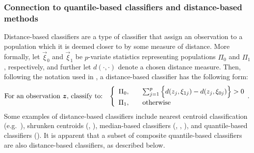 


\subsubsection{Connection to quantile-based classifiers and distance-based
  methods }
\label{sec:similarities-to-existing}

Distance-based classifiers are a type of classifier that assign an observation
to a population which it is deemed closer to by some measure of distance.  More
formally, let $\vec{\xi}_0$ and $\vec{\xi}_1$ be $p$-variate statistics
representing populations $\Pi_0$ and $\Pi_1$, respectively, and further let
$d(\cdot, \cdot)$ denote a chosen distance measure. Then, following the notation
used in \cite{hennig2016}, a distance-based classifier has the following form:
\begin{equation}
  \label{eq:distance-based-classifier}
  \text{For an observation $\vec{z}$, classify to:}  \hspace{3mm}
  \left\{
    \begin{array}{lll}
      \Pi_0, & & \sum_{j=1}^p
                 \Big\{
                 d(z_j, \xi_{1j}) - d(z_j, \xi_{0j})
                 \Big\} > 0 \\[1ex]
      \Pi_1, & & \text{otherwise}
    \end{array}.
  \right.
\end{equation}
Some examples of distance-based classifiers include nearest centroid
classification (e.g.\ \cite{hastie2009}), shrunken centroids
(\cite{tibshirani2002}, \cite{wang2007}), median-based classifiers
(\cite{jornsten2004}, \cite{ghosh2005}, \cite{hall2012}), and quantile-based
classifiers (\cite{hennig2016}).  It is apparent that a subset of composite
quantile-based classifiers are also distance-based classifiers, as described
below.


